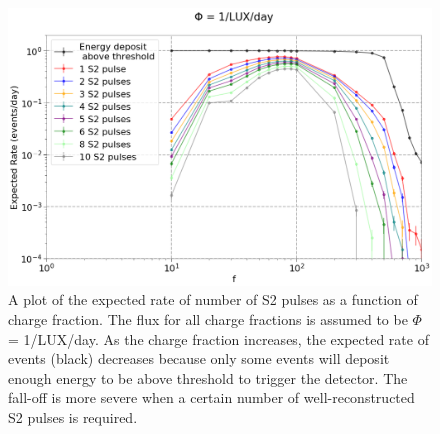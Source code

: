 \begin{figure}[htbp]
\begin{center}
\includegraphics[width=\textwidth]{figures/lips/test_flux.png}
\caption{A plot of the expected rate of number of S2 pulses as a function of charge fraction. The flux for all charge fractions is assumed to be  $\Phi$ = 1/\ac{LUX}/day. As the charge fraction increases, the expected rate of events (black) decreases because only some events will deposit enough energy to be above threshold to trigger the detector. The fall-off is more severe when a certain number of well-reconstructed S2 pulses is required. }
\label{fig:test_flux}
\end{center}
\end{figure}


